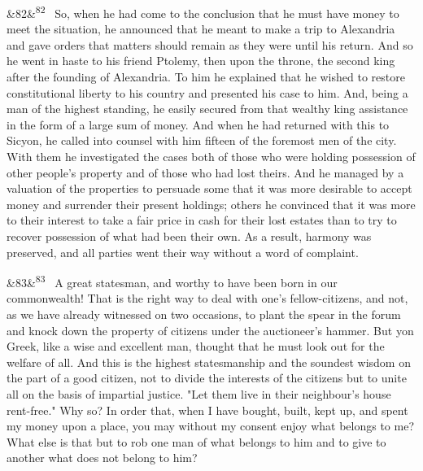 \documentclass[12pt]{article}
\newcommand{\para}[1][]{\par\noindent\ifx&#1&\else\textsuperscript{\footnotesize #1}~\fi}
\begin{document}
\para[82] So, when he had come to the conclusion that he must have money to meet the situation, he announced that he meant to make a trip to Alexandria and gave orders that matters should remain as they were until his return. And so he went in haste to his friend Ptolemy, then upon the throne, the second king after the founding of Alexandria. To him he explained that he wished to restore constitutional liberty to his country and presented his case to him. And, being a man of the highest standing, he easily secured from that wealthy king assistance in the form of a large sum of money. And when he had returned with this to Sicyon, he called into counsel with him fifteen of the foremost men of the city. With them he investigated the cases both of those who were holding possession of other people's property and of those who had lost theirs. And he managed by a valuation of the properties to persuade some that it was more desirable to accept money and surrender their present holdings; others he convinced that it was more to their interest to take a fair price in cash for their lost estates than to try to recover possession of what had been their own. As a result, harmony was preserved, and all parties went their way without a word of complaint.

\para[83] A great statesman, and worthy to have been born in our commonwealth! That is the right way to deal with one's fellow-citizens, and not, as we have already witnessed on two occasions, to plant the spear in the forum and knock down the property of citizens under the auctioneer's hammer. But yon Greek, like a wise and excellent man, thought that he must look out for the welfare of all. And this is the highest statesmanship and the soundest wisdom on the part of a good citizen, not to divide the interests of the citizens but to unite all on the basis of impartial justice. "Let them live in their neighbour's house rent-free." Why so? In order that, when I have bought, built, kept up, and spent my money upon a place, you may without my consent enjoy what belongs to me? What else is that but to rob one man of what belongs to him and to give to another what does not belong to him?
\end{document}
